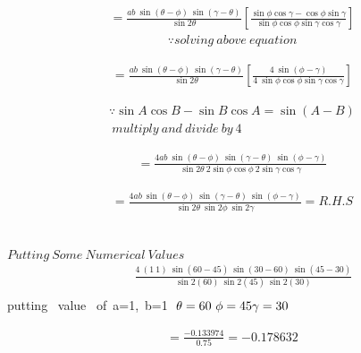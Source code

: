 \documentclass[journal,12pt,twocolumn]{IEEEtran}
\begin{document}
\begin{multline}
=\frac{ab~\sin(\theta-\phi)~\sin(\gamma-\theta)}{ \sin2\theta}\left[\frac{\sin\phi\cos\gamma-\cos\phi\sin\gamma}{\sin\phi\cos\phi\sin\gamma\cos\gamma}
\right]
\end{multline}
\begin{align*}
\because solving ~above~equation 
\end{align*}


\begin{multline}
=\frac{ab~\sin(\theta-\phi)~\sin(\gamma-\theta)}{ \sin2\theta}\left[\frac{4~\sin(\phi-\gamma)}{4~\sin\phi\cos\phi\sin\gamma\cos\gamma}
\right]
\end{multline}

\begin{align*}
\because \sin A\cos B - \sin B\cos A=\sin(A-B)\\
~multiply ~and ~divide ~by ~4
\end{align*}


\begin{multline}
=\frac{4ab~\sin(\theta-\phi)~\sin(\gamma-\theta)~\sin(\phi-\gamma)}{ \sin2\theta~2\sin\phi\cos\phi~2\sin\gamma\cos\gamma}
\end{multline}

\begin{multline}
=\frac{4ab~\sin(\theta-\phi)~\sin(\gamma-\theta)~\sin(\phi-\gamma)}{ \sin2\theta~\sin2\phi~\sin2\gamma} = R.H.S
\end{multline}
\\\\
$Putting ~Some ~Numerical~ Values$
\begin{multline}
~~~~~~~~\frac{4~(1~1)~\sin(60-45)~\sin(30-60)~\sin(45-30)}{ \sin2(60)~\sin2(45)~\sin2(30)}\\
\end{multline}
putting~ value~ of~a=1,~b=1 $~\theta=60~\phi=45 \\ \gamma=30$

\begin{multline}
=\frac{-0.133974}{0.75}=-0.178632\\
\end{multline}
\end{document}
